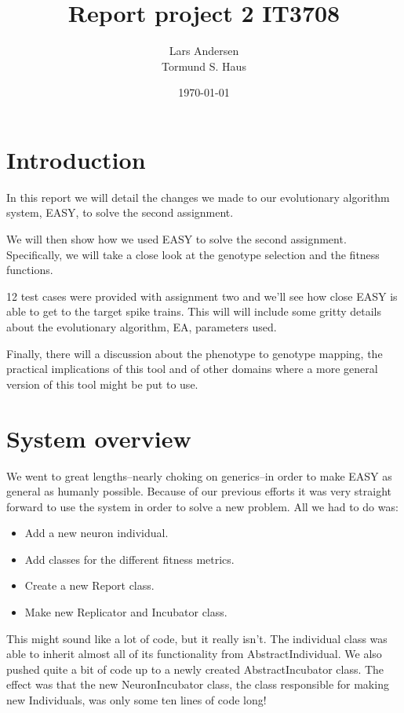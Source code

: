 \documentclass[a4paper]{article}
\title{Report project 2 IT3708}
\author{Lars Andersen \\
    Tormund S. Haus}
\date{\today}
\begin{document}
\maketitle

\section{Introduction}
\label{sec:introduction}

In this report we will detail the changes we made to our evolutionary algorithm system, EASY, to solve the second assignment.

We will then show how we used EASY to solve the second assignment. Specifically, we will take a close look at the genotype selection and the fitness functions.

12 test cases were provided with assignment two and we'll see how close EASY is able to get to the target spike trains. This will will include some gritty details about the evolutionary algorithm, EA, parameters used.

Finally, there will a discussion about the phenotype to genotype mapping, the practical implications of this tool and of other domains where a more general version of this tool might be put to use.

\section{System overview}
\label{sec:system_overview}

We went to great lengths--nearly choking on generics--in order to make EASY as general as humanly possible. Because of our previous efforts it was very straight forward to use the system in order to solve a new problem. All we had to do was:

\begin{itemize}
\item Add a new neuron individual.
\item Add classes for the different fitness metrics.
\item Create a new Report class.
\item Make new Replicator and Incubator class.
\end{itemize}

This might sound like a lot of code, but it really isn't. The individual class was able to inherit almost all of its functionality from AbstractIndividual. We also pushed quite a bit of code up to a newly created AbstractIncubator class. The effect was that the new NeuronIncubator class, the class responsible for making new Individuals, was only some ten lines of code long!
\end{document}

